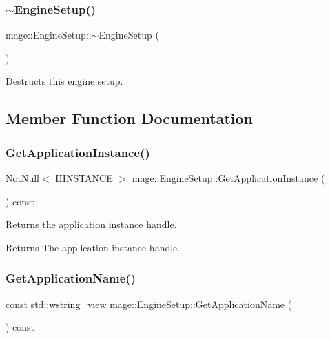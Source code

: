 \subsubsection{\texorpdfstring{$\sim$\+Engine\+Setup()}{~EngineSetup()}}
{\footnotesize\ttfamily mage\+::\+Engine\+Setup\+::$\sim$\+Engine\+Setup (\begin{DoxyParamCaption}{ }\end{DoxyParamCaption})\hspace{0.3cm}{\ttfamily [default]}}

Destructs this engine setup. 

\subsection{Member Function Documentation}
\mbox{\label{classmage_1_1_engine_setup_a278a3df908b5b369a597812de4010532}} 
\subsubsection{\texorpdfstring{Get\+Application\+Instance()}{GetApplicationInstance()}}
{\footnotesize\ttfamily \mbox{\hyperlink{namespacemage_a8769f9d670d6b585ea306cb1062af94b}{Not\+Null}}$<$ H\+I\+N\+S\+T\+A\+N\+CE $>$ mage\+::\+Engine\+Setup\+::\+Get\+Application\+Instance (\begin{DoxyParamCaption}{ }\end{DoxyParamCaption}) const\hspace{0.3cm}{\ttfamily [noexcept]}}

Returns the application instance handle.

\begin{DoxyReturn}{Returns}
The application instance handle. 
\end{DoxyReturn}
\mbox{\label{classmage_1_1_engine_setup_a45863627ae7cfdd92b6b059d4538359d}} 
\subsubsection{\texorpdfstring{Get\+Application\+Name()}{GetApplicationName()}}
{\footnotesize\ttfamily const std\+::wstring\+\_\+view mage\+::\+Engine\+Setup\+::\+Get\+Application\+Name (\begin{DoxyParamCaption}{ }\end{DoxyParamCaption}) const\hspace{0.3cm}{\ttfamily [noexcept]}}

